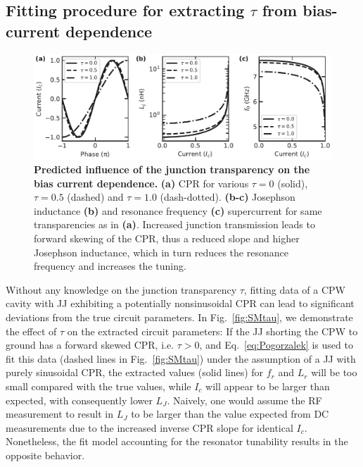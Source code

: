\subsection{Fitting procedure for extracting $\tau$ from bias-current dependence}\label{sec:fitbiascurrent}

\begin{figure}
	\centering
	\includegraphics[width=\linewidth]{chapter-gJJ-CPR/figs/SMFigure-influence}
	\caption{
		\textbf{Predicted influence of the junction transparency on the bias current dependence.}
		\textbf{(a)} CPR for various $\tau=0$ (solid), $\tau=0.5$ (dashed) and $\tau=1.0$	(dash-dotted).
		\textbf{(b-c)} Josephson inductance \textbf{(b)} and resonance frequency \textbf{(c)} supercurrent for	same transparencies as in \textbf{(a)}.
		Increased junction transmission leads to forward skewing of the CPR, thus a reduced slope and higher Josephson inductance, which in turn reduces the resonance frequency and increases the tuning.
	}
	\label{fig:SMinfluence}
\end{figure}

Without any knowledge on the junction transparency $\tau$, fitting data of a CPW cavity with JJ exhibiting a potentially nonsinusoidal CPR can lead to significant deviations from the true circuit parameters.
%
In Fig.~\ref{fig:SMtau}, we demonstrate the effect of $\tau$ on the extracted circuit parameters:
%
If the JJ shorting the CPW to ground has a forward skewed CPR, i.e. $\tau>0$, and Eq.~\ref{eq:Pogorzalek} is used to fit this data (dashed lines in Fig.~\ref{fig:SMtau}) under the assumption of a JJ with purely sinusoidal CPR, the extracted values (solid lines) for $f_r$ and $L_r$ will be too small compared with the true values, while $I_c$ will appear to be larger than expected, with consequently lower $L_J$.
%
Naively, one would assume the RF measurement to result in $L_J$ to be larger than the value expected from DC measurements due to the increased inverse CPR slope for identical $I_c$.
%
Nonetheless, the fit model accounting for the resonator tunability results in the opposite behavior.

